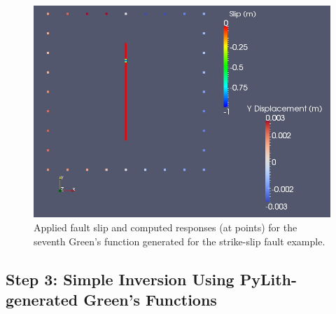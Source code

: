 \begin{figure}
  \includegraphics[scale=0.33]{examples/figs/greensfns2d_strikeslip_gf6}
  \caption{Applied fault slip and computed responses (at points) for the seventh
    Green's function generated for the strike-slip fault example.}
  \label{fig:greensfns2d-strikeslip-gf6}
\end{figure}


\subsection{Step 3: Simple Inversion Using PyLith-generated Green's Functions}
\label{sec:example:greensfns2d:inversion}


